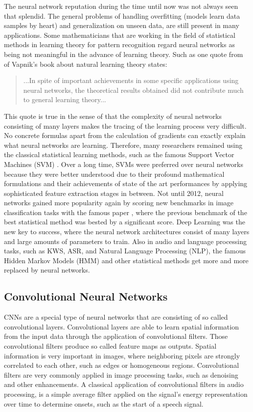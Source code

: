 The neural network reputation during the time until now was not always seen that splendid.
The general problems of handling overfitting (models learn data samples by heart) and generalization on unseen data, are still present in many applications.
Some mathematicians that are working in the field of statistical methods in learning theory for pattern recognition regard neural networks as being not meaningful in the advance of learning theory.
Such as one quote from \cite{Vapnik1995} of Vapnik's book about natural learning theory states:
\begin{quote}
...In spite of important achievements in some specific applications using neural networks, the theoretical results obtained did not contribute much to general learning theory...
\end{quote}
This quote is true in the sense of that the complexity of neural networks consisting of many layers makes the tracing of the learning process very difficult.
No concrete formulas apart from the calculation of gradients can exactly explain what neural networks are learning.
Therefore, many researchers remained using the classical statistical learning methods, such as the famous Support Vector Machines (SVM) \cite{Cortes1995}.
Over a long time, SVMs were preferred over neural networks because they were better understood due to their profound mathematical formulations and their achievements of state of the art performances by applying sophisticated feature extraction stages in between.
Not until 2012, neural networks gained more popularity again by scoring new benchmarks in image classification tasks with the famous paper \cite{Krizhevsky2012}, where the previous benchmark of the best statistical method was bested by a significant score.
Deep Learning was the new key to success, where the neural network architectures consist of many layers and large amounts of parameters to train.
Also in audio and language processing tasks, such as KWS, ASR, and Natural Language Processing (NLP), the famous Hidden Markov Models (HMM) and other statistical methods get more and more replaced by neural networks.



\subsection{Convolutional Neural Networks}\label{sec:prev_nn_cnn}
CNNs are a special type of neural networks that are consisting of so called convolutional layers.
Convolutional layers are able to learn spatial information from the input data through the application of convolutional filters.
Those convolutional filters produce so called feature maps as outputs.
Spatial information is very important in images, where neighboring pixels are strongly correlated to each other, such as edges or homogeneous regions.
Convolutional filters are very commonly applied in image processing tasks, such as denoising and other enhancements.
A classical application of convolutional filters in audio processing, is a simple average filter applied on the signal's energy representation over time to determine onsets, such as the start of a speech signal.

